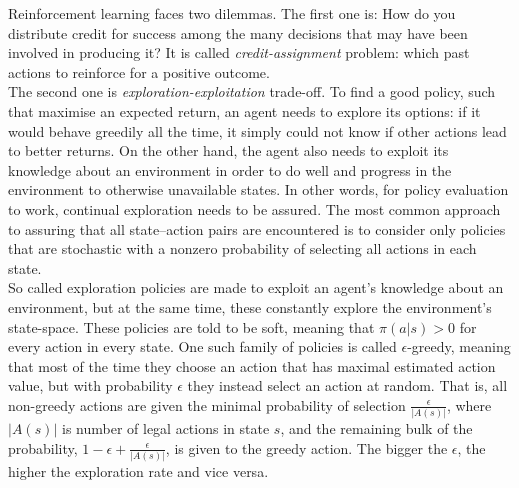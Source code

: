 Reinforcement learning faces two dilemmas. The first one is: How do you distribute credit for success among the many decisions that may have been involved in producing it? It is called \textit{credit-assignment} problem: which past actions to reinforce for a positive outcome. \\
The second one is \textit{exploration-exploitation} trade-off. To find a good policy, such that maximise an expected return, an agent needs to explore its options: if it would behave greedily all the time, it simply could not know if other actions lead to better returns. On the other hand, the agent also needs to exploit its knowledge about an environment in order to do well and progress in the environment to otherwise unavailable states. In other words, for policy evaluation to work, continual exploration needs to be assured. The most common approach to assuring that all state–action pairs are encountered is to consider only policies that are stochastic with a nonzero probability of selecting all actions in each state. \\
So called exploration policies are made to exploit an agent's knowledge about an environment, but at the same time, these constantly explore the environment's state-space. These policies are told to be soft, meaning that $\pi(a|s) > 0$ for every action in every state. One such family of policies is called $\epsilon$-greedy, meaning that most of the time they choose an action that has maximal estimated action value, but with probability $\epsilon$ they instead select an action at random. That is, all non-greedy actions are given the minimal probability of selection $\frac{\epsilon}{|A(s)|}$, where $|A(s)|$ is number of legal actions in state $s$, and the remaining bulk of the probability, $1 - \epsilon + \frac{\epsilon}{|A(s)|}$, is given to the greedy action. The bigger the $\epsilon$, the higher the exploration rate and vice versa.

